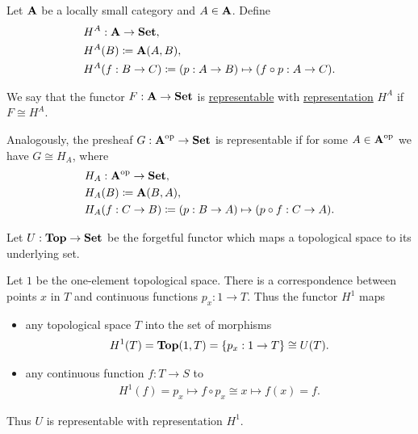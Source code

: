 \begin{definition}\label{def:representable_functor}\cite[definitions 4.1.3, 4.1.16]{Leinster2014}
  Let $\operatorname{\mathbf{A}}$ be a locally small category and $A \in \operatorname{\mathbf{A}}$. Define
  \begin{align*}
    &H^A: \operatorname{\mathbf{A}} \to \operatorname{\mathbf{Set}}, \\
    &H^A(B) \coloneqq \operatorname{\mathbf{A}}(A, B), \\
    &H^A(f: B \to C) \coloneqq (p: A \to B) \mapsto (f \circ p: A \to C).
  \end{align*}

  We say that the functor $F: \operatorname{\mathbf{A}} \to \operatorname{\mathbf{Set}}$ is \uline{representable} with \uline{representation} $H^A$ if $F \cong H^A$.

  Analogously, the presheaf $G: \operatorname{\mathbf{A}}^{\operatorname{op}} \to \operatorname{\mathbf{Set}}$ is representable if for some $A \in \operatorname{\mathbf{A}}^{\operatorname{op}}$ we have $G \cong H_A$, where
  \begin{align*}
    &H_A: \operatorname{\mathbf{A}}^{\operatorname{op}} \to \operatorname{\mathbf{Set}}, \\
    &H_A(B) \coloneqq \operatorname{\mathbf{A}}(B, A), \\
    &H_A(f: C \to B) \coloneqq (p: B \to A) \mapsto (p \circ f: C \to A).
  \end{align*}
\end{definition}

\begin{example}\label{def:top_representable_functor}\cite[example 4.1.4]{Leinster2014}
  Let $U: \operatorname{\mathbf{Top}} \to \operatorname{\mathbf{Set}}$ be the forgetful functor which maps a topological space to its underlying set.

  Let $1$ be the one-element topological space. There is a correspondence between points $x$ in $T$ and continuous functions $p_x: 1 \to T$. Thus the functor $H^1$ maps
  \begin{itemize}
    \item any topological space $T$ into the set of morphisms
    \begin{align*}
      H^1(T) = \operatorname{\mathbf{Top}}(1, T) = \{ p_x: 1 \to T \} \cong U(T).
    \end{align*}
    \item any continuous function $f: T \to S$ to
    \begin{align*}
      H^1(f) = p_x \mapsto f \circ p_x \cong x \mapsto f(x) = f.
    \end{align*}
  \end{itemize}

  Thus $U$ is representable with representation $H^1$.
\end{example}


